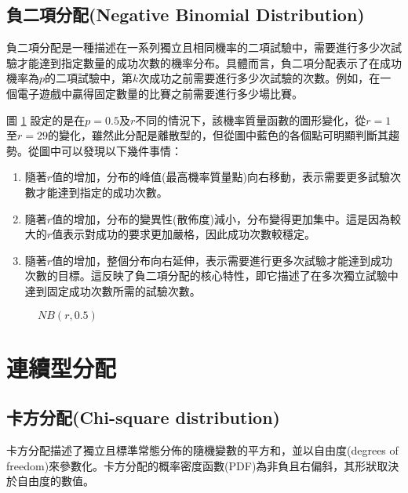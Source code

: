 \subsection{負二項分配(Negative Binomial Distribution)}
負二項分配是一種描述在一系列獨立且相同機率的二項試驗中，需要進行多少次試驗才能達到指定數量的成功次數的機率分布。具體而言，負二項分配表示了在成功機率為$p$的二項試驗中，第$k$次成功之前需要進行多少次試驗的次數。例如，在一個電子遊戲中贏得固定數量的比賽之前需要進行多少場比賽。

圖 \ref{fig:negativebinomial_r} 設定的是在$p=0.5$及$r$不同的情況下，該機率質量函數的圖形變化，從$r=1$至$r=29$的變化，雖然此分配是離散型的，但從圖中藍色的各個點可明顯判斷其趨勢。從圖中可以發現以下幾件事情：
\begin{enumerate}
\item 隨著$r$值的增加，分布的峰值(最高機率質量點)向右移動，表示需要更多試驗次數才能達到指定的成功次數。
\item 隨著$r$值的增加，分布的變異性(散佈度)減小，分布變得更加集中。這是因為較大的$r$值表示對成功的要求更加嚴格，因此成功次數較穩定。
\item 隨著$r$值的增加，整個分布向右延伸，表示需要進行更多次試驗才能達到成功次數的目標。這反映了負二項分配的核心特性，即它描述了在多次獨立試驗中達到固定成功次數所需的試驗次數。
\end{enumerate}
\begin{figure}[h]
    \caption{$NB(r,0.5)$}
    \label{fig:negativebinomial_r}
\end{figure}
\section{連續型分配}
\subsection{卡方分配(Chi-square distribution)}
卡方分配描述了獨立且標準常態分佈的隨機變數的平方和，並以自由度(degrees of freedom)來參數化。卡方分配的概率密度函數(PDF)為非負且右偏斜，其形狀取決於自由度的數值。

